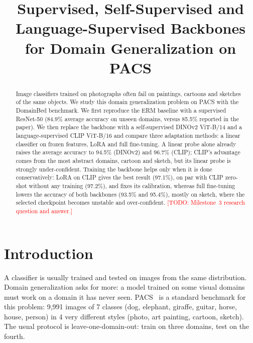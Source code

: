 \documentclass[conference]{IEEEtran}
\newcommand{\todo}[1]{\textcolor{red}{[TODO: #1]}}
\begin{document}
\title{Supervised, Self-Supervised and Language-Supervised Backbones for Domain Generalization on PACS}

\author{
}

\maketitle

\begin{abstract}
Image classifiers trained on photographs often fail on paintings, cartoons and sketches of the same objects. We study this domain generalization problem on PACS with the DomainBed benchmark. We first reproduce the ERM baseline with a supervised ResNet-50 (84.9\% average accuracy on unseen domains, versus 85.5\% reported in the paper). We then replace the backbone with a self-supervised DINOv2 ViT-B/14 and a language-supervised CLIP ViT-B/16 and compare three adaptation methods: a linear classifier on frozen features, LoRA and full fine-tuning. A linear probe alone already raises the average accuracy to 94.5\% (DINOv2) and 96.7\% (CLIP); CLIP's advantage comes from the most abstract domains, cartoon and sketch, but its linear probe is strongly under-confident. Training the backbone helps only when it is done conservatively: LoRA on CLIP gives the best result (97.1\%), on par with CLIP zero-shot without any training (97.2\%), and fixes its calibration, whereas full fine-tuning lowers the accuracy of both backbones (93.5\% and 95.4\%), mostly on sketch, where the selected checkpoint becomes unstable and over-confident. \todo{Milestone~3 research question and answer.}
\end{abstract}

\section{Introduction}
A classifier is usually trained and tested on images from the same distribution. Domain generalization asks for more: a model trained on some visual domains must work on a domain it has never seen. PACS~\cite{li2017pacs} is a standard benchmark for this problem: 9{,}991 images of 7 classes (dog, elephant, giraffe, guitar, horse, house, person) in 4 very different styles (photo, art painting, cartoon, sketch). The usual protocol is leave-one-domain-out: train on three domains, test on the fourth.
\end{document}
